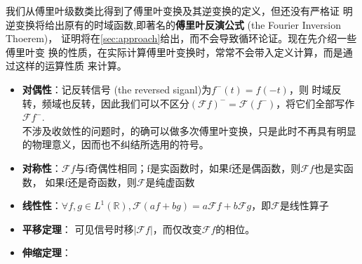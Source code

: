 \documentclass{ctexbook}
\begin{document}
我们从傅里叶级数类比得到了傅里叶变换及其逆变换的定义，但还没有严格证
明逆变换将给出原有的时域函数,即著名的\textbf{傅里叶反演公式} (the Fourier Inversion Thoerem)，
证明将在\ref{sec:approach}给出，而不会导致循环论证。现在先介绍一些傅里叶变
换的性质，在实际计算傅里叶变换时，常常不会带入定义计算，而是通过这样的运算性质
来计算。
{\nolinebreak[4]
\begin{itemize}
    \item \textbf{对偶性}：记反转信号 (the reversed siganl)为$f^-(t)=f(-t)$，则
          时域反转，频域也反转，因此我们可以不区分$(\mathcal{F}f)^-=\mathcal{F} (f^-)$，将它们全部写作$\mathcal{F} f^-$.\\
          不涉及收敛性的问题时，的确可以做多次傅里叶变换，只是此时不再具有明显的物理意义，因而也不纠结所选用的符号。
    \item \textbf{对称性}：$\mathcal{F} f$与f奇偶性相同；f是实函数时，如果f还是偶函数，则$\mathcal{F} f$也是实函数，
          如果f还是奇函数，则$\mathcal{F} $是纯虚函数
    \item \textbf{线性性}：$\forall f,g\in L^1(\mathbb{R}),\mathcal{F} (af+bg)=a\mathcal{F} f+b\mathcal{F} g$，即$\mathcal{F} $是线性算子
    \item \textbf{平移定理}：
          可见信号时移$|\mathcal{F} f|$，而仅改变$\mathcal{F} f$的相位。
    \item \textbf{伸缩定理}：
\end{itemize}}
\end{document}
